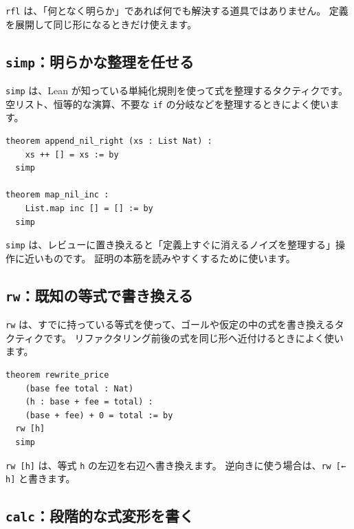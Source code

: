 \texttt{rfl} は、「何となく明らか」であれば何でも解決する道具ではありません。
定義を展開して同じ形になるときだけ使えます。

\subsection{\texttt{simp}：明らかな整理を任せる}

\texttt{simp} は、Lean が知っている単純化規則を使って式を整理するタクティクです。
空リスト、恒等的な演算、不要な \texttt{if} の分岐などを整理するときによく使います。

\begin{listing}[htbp]
\begin{verbatim}
theorem append_nil_right (xs : List Nat) :
    xs ++ [] = xs := by
  simp

theorem map_nil_inc :
    List.map inc [] = [] := by
  simp
\end{verbatim}
\caption{\texttt{append\_nil\_right}・\texttt{map\_nil\_inc}}
\label{lst:appA_simp}
\end{listing}

\texttt{simp} は、レビューに置き換えると「定義上すぐに消えるノイズを整理する」操作に近いものです。
証明の本筋を読みやすくするために使います。

\subsection{\texttt{rw}：既知の等式で書き換える}

\texttt{rw} は、すでに持っている等式を使って、ゴールや仮定の中の式を書き換えるタクティクです。
リファクタリング前後の式を同じ形へ近付けるときによく使います。

\begin{listing}[htbp]
\begin{verbatim}
theorem rewrite_price
    (base fee total : Nat)
    (h : base + fee = total) :
    (base + fee) + 0 = total := by
  rw [h]
  simp
\end{verbatim}
\caption{\texttt{rewrite\_price}}
\label{lst:appA_rw}
\end{listing}

\texttt{rw [h]} は、等式 \texttt{h} の左辺を右辺へ書き換えます。
逆向きに使う場合は、\texttt{rw [← h]} と書きます。

\subsection{\texttt{calc}：段階的な式変形を書く}

